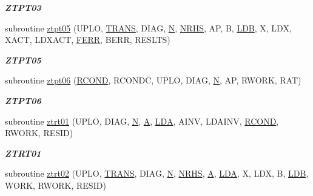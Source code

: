 \begin{DoxyCompactItemize}
\begin{DoxyCompactList}\small\item\em {\bfseries Z\+T\+P\+T03} \end{DoxyCompactList}\item 
subroutine \hyperlink{group__complex16__lin_ga6e990b646a8c259d435fbb48bd230814}{ztpt05} (U\+P\+L\+O, \hyperlink{superlu__enum__consts_8h_a0c4e17b2d5cea33f9991ccc6a6678d62a1f61e3015bfe0f0c2c3fda4c5a0cdf58}{T\+R\+A\+N\+S}, D\+I\+A\+G, \hyperlink{polmisc_8c_a0240ac851181b84ac374872dc5434ee4}{N}, \hyperlink{example__user_8c_aa0138da002ce2a90360df2f521eb3198}{N\+R\+H\+S}, A\+P, B, \hyperlink{example__user_8c_a50e90a7104df172b5a89a06c47fcca04}{L\+D\+B}, X, L\+D\+X, X\+A\+C\+T, L\+D\+X\+A\+C\+T, \hyperlink{superlu__enum__consts_8h_af00a42ecad444bbda75cde1b64bd7e72a78fd14d7abebae04095cfbe02928f153}{F\+E\+R\+R}, B\+E\+R\+R, R\+E\+S\+L\+T\+S)
\begin{DoxyCompactList}\small\item\em {\bfseries Z\+T\+P\+T05} \end{DoxyCompactList}\item 
subroutine \hyperlink{group__complex16__lin_gaea2e247efc6d2c0e6c7265b3e7d1d45e}{ztpt06} (\hyperlink{superlu__enum__consts_8h_af00a42ecad444bbda75cde1b64bd7e72a9b5c151728d8512307565994c89919d5}{R\+C\+O\+N\+D}, R\+C\+O\+N\+D\+C, U\+P\+L\+O, D\+I\+A\+G, \hyperlink{polmisc_8c_a0240ac851181b84ac374872dc5434ee4}{N}, A\+P, R\+W\+O\+R\+K, R\+A\+T)
\begin{DoxyCompactList}\small\item\em {\bfseries Z\+T\+P\+T06} \end{DoxyCompactList}\item 
subroutine \hyperlink{group__complex16__lin_gaa5d5db213ec0e40b3c6bcb78c93c6e5c}{ztrt01} (U\+P\+L\+O, D\+I\+A\+G, \hyperlink{polmisc_8c_a0240ac851181b84ac374872dc5434ee4}{N}, \hyperlink{classA}{A}, \hyperlink{example__user_8c_ae946da542ce0db94dced19b2ecefd1aa}{L\+D\+A}, A\+I\+N\+V, L\+D\+A\+I\+N\+V, \hyperlink{superlu__enum__consts_8h_af00a42ecad444bbda75cde1b64bd7e72a9b5c151728d8512307565994c89919d5}{R\+C\+O\+N\+D}, R\+W\+O\+R\+K, R\+E\+S\+I\+D)
\begin{DoxyCompactList}\small\item\em {\bfseries Z\+T\+R\+T01} \end{DoxyCompactList}\item 
subroutine \hyperlink{group__complex16__lin_gafae808458949f419f7139682e041157a}{ztrt02} (U\+P\+L\+O, \hyperlink{superlu__enum__consts_8h_a0c4e17b2d5cea33f9991ccc6a6678d62a1f61e3015bfe0f0c2c3fda4c5a0cdf58}{T\+R\+A\+N\+S}, D\+I\+A\+G, \hyperlink{polmisc_8c_a0240ac851181b84ac374872dc5434ee4}{N}, \hyperlink{example__user_8c_aa0138da002ce2a90360df2f521eb3198}{N\+R\+H\+S}, \hyperlink{classA}{A}, \hyperlink{example__user_8c_ae946da542ce0db94dced19b2ecefd1aa}{L\+D\+A}, X, L\+D\+X, B, \hyperlink{example__user_8c_a50e90a7104df172b5a89a06c47fcca04}{L\+D\+B}, W\+O\+R\+K, R\+W\+O\+R\+K, R\+E\+S\+I\+D)

\end{DoxyCompactItemize}
